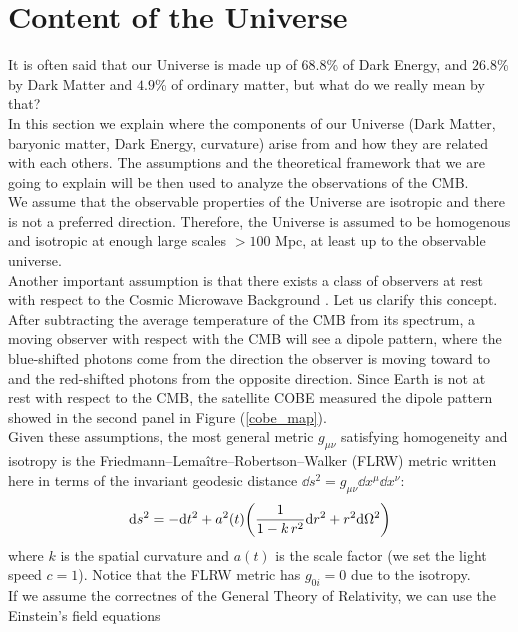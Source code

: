 \documentclass{article}
\begin{document}
\newpage


\section{Content of the Universe} 
It is often said that our Universe is made up of $68.8$\% of Dark Energy, and $26.8 $\% by Dark Matter and $4.9 $\% of ordinary matter, but what do we really mean by that?\\
In this section we explain where the components of our Universe (Dark Matter, baryonic matter, Dark Energy, curvature)  arise from and how they are related with each others. 
The assumptions and the theoretical framework that we are going to explain will be then used to analyze the observations of the CMB.\\
We assume that the observable properties of the Universe are isotropic and there is not a preferred direction. 
Therefore, the Universe is assumed to be homogenous and isotropic at enough large scales $> 100$ Mpc, at least up to the observable universe.\\
Another important assumption is that there exists a class of observers at rest with respect to the Cosmic Microwave Background \citep{bartelmannStandardModelCosmology}.
Let us clarify this concept. 
After subtracting the average temperature of the CMB from its spectrum, a moving observer with respect with the CMB will see a dipole pattern, where the blue-shifted photons come from the direction the observer is moving toward to and the red-shifted photons from the opposite direction.
Since Earth is not at rest with respect to the CMB, the satellite COBE measured the dipole pattern showed in the second panel in Figure (\ref{cobe_map}).\\
Given these assumptions, the most general metric $g_{\mu \nu}$ satisfying homogeneity and isotropy is the Friedmann–Lemaître–Robertson–Walker (FLRW) metric written here in terms of the invariant geodesic distance $\dd s ^2 = g_{\mu \nu} \dd x^{\mu} \dd x^{\nu}$:
\begin{equation}
\label{metric}
\dd s ^2 = -\dd t^2 + a^2 (t) \qty( \frac{1}{1-k \, r^2} \dd r^2 + r^2 \dd \Omega ^2 )  
\end{equation}
where $k$ is the spatial curvature and $a(t)$ is the scale factor (we set the light speed $c=1$).
Notice that the FLRW metric has $g_{0 i}=0$ due to the isotropy.
\\ %
If we assume the correctnes of the General Theory of Relativity, we can use the Einstein's field equations
\end{document}
